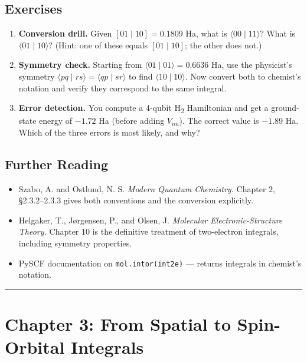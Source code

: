 \documentclass[
  11pt,
  oneside]{book}
\providecommand{\tightlist}{%
  \setlength{\itemsep}{0pt}\setlength{\parskip}{0pt}}
\begin{document}
\section{Exercises}\label{exercises-1}

\begin{enumerate}
\def\labelenumi{\arabic{enumi}.}
\item
  \textbf{Conversion drill.} Given \([01 \mid 10] = 0.1809\) Ha, what is
  \(\langle 00 \mid 11\rangle\)? What is \(\langle 01 \mid 10\rangle\)?
  (Hint: one of these equals \([01 \mid 10]\); the other does not.)
\item
  \textbf{Symmetry check.} Starting from
  \(\langle 01 \mid 01\rangle = 0.6636\) Ha, use the physicist's
  symmetry \(\langle pq \mid rs\rangle = \langle qp \mid sr\rangle\) to
  find \(\langle 10 \mid 10\rangle\). Now convert both to chemist's
  notation and verify they correspond to the same integral.
\item
  \textbf{Error detection.} You compute a 4-qubit H\textsubscript{2} Hamiltonian and get
  a ground-state energy of \(-1.72\) Ha (before adding \(V_{nn}\)). The
  correct value is \(-1.89\) Ha. Which of the three errors is most
  likely, and why?
\end{enumerate}

\section{Further Reading}\label{further-reading-1}

\begin{itemize}
\tightlist
\item
  Szabo, A. and Ostlund, N. S. \emph{Modern Quantum Chemistry.} Chapter
  2, §2.3.2--2.3.3 gives both conventions and the conversion explicitly.
\item
  Helgaker, T., Jørgensen, P., and Olsen, J. \emph{Molecular
  Electronic-Structure Theory.} Chapter 10 is the definitive treatment
  of two-electron integrals, including symmetry properties.
\item
  PySCF documentation on
  \texttt{mol.intor(\textquotesingle{}int2e\textquotesingle{})} ---
  returns integrals in chemist's notation.
\end{itemize}

\begin{center}\rule{0.5\linewidth}{0.5pt}\end{center}

\chapter{Chapter 3: From Spatial to Spin-Orbital
Integrals}\label{chapter-3-from-spatial-to-spin-orbital-integrals}
\end{document}
